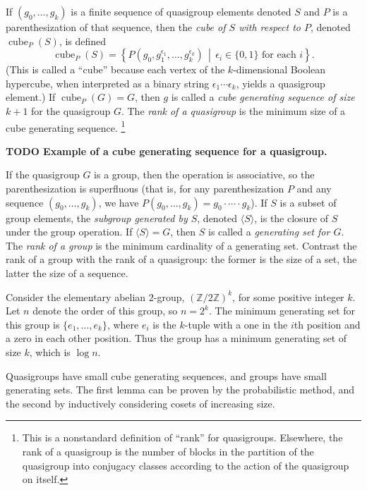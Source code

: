 \documentclass{article}
\newcommand{\todo}[1]{\textbf{TODO #1}}
\newcommand{\gen}[1]{\langle #1 \rangle}
\DeclareMathOperator{\cube}{cube}
\begin{document}
If $(g_0, \dotsc, g_k)$ is a finite sequence of quasigroup elements denoted $S$ and $P$ is a parenthesization of that sequence, then the \emph{cube of $S$ with respect to $P$}, denoted $\cube_P(S)$, is defined
\begin{equation*}
  \cube_P(S) = \left\{P(g_0, g_1^{\epsilon_1}, \dotsc, g_k^{\epsilon_k}) \, \middle| \, \epsilon_i \in \{0, 1\} \text{ for each } i \right\}.
\end{equation*}
(This is called a ``cube'' because each vertex of the $k$-dimensional Boolean hypercube, when interpreted as a binary string $\epsilon_1 \dotsb \epsilon_k$, yields a quasigroup element.)
If $\cube_P(G) = G$, then $g$ is called a \emph{cube generating sequence of size $k + 1$} for the quasigroup $G$.
The \emph{rank of a quasigroup} is the minimum size of a cube generating sequence.
\footnote{
  This is a nonstandard definition of ``rank'' for quasigroups.
  Elsewhere, the rank of a quasigroup is the number of blocks in the partition of the quasigroup into conjugacy classes according to the action of the quasigroup on itself.
}

\todo{Example of a cube generating sequence for a quasigroup.}

If the quasigroup $G$ is a group, then the operation is associative, so the parenthesization is superfluous (that is, for any parenthesization $P$ and any sequence $(g_0, \dotsc, g_k)$, we have $P(g_0, \dotsc, g_k) = g_0 \cdot \dotsb \cdot g_k$).
If $S$ is a subset of group elements, the \emph{subgroup generated by $S$}, denoted $\gen{S}$, is the closure of $S$ under the group operation.
If $\gen{S} = G$, then $S$ is called a \emph{generating set for $G$}.
The \emph{rank of a group} is the minimum cardinality of a generating set.
Contrast the rank of a group with the rank of a quasigroup: the former is the size of a set, the latter the size of a sequence.

\begin{example}
  Consider the elementary abelian $2$-group, $(\mathbb{Z} / 2 \mathbb{Z})^k$, for some positive integer $k$.
  Let $n$ denote the order of this group, so $n = 2^k$.
  The minimum generating set for this group is $\{e_1, \dotsc, e_k\}$, where $e_i$ is the $k$-tuple with a one in the $i$th position and a zero in each other position.
  Thus the group has a minimum generating set of size $k$, which is $\log n$.
\end{example}

Quasigroups have small cube generating sequences, and groups have small generating sets.
The first lemma can be proven by the probabilistic method, and the second by inductively considering cosets of increasing size.
\end{document}
